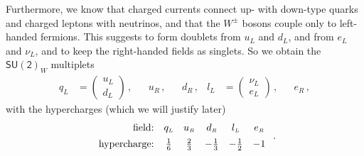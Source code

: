 \documentclass[12pt]{report}
\newcommand{\ls}{{\ensuremath{\scriptscriptstyle L}}}
\newcommand{\rs}{{\ensuremath{\scriptscriptstyle R}}}
\newcommand{\2}{\ensuremath{\sqrt{2}\,}}
\begin{document}
{      Furthermore, we know that charged currents connect up- with down-type
      quarks and charged leptons with neutrinos, and that the $W^\pm$ bosons couple only to
      left-handed fermions. This suggests to form doublets  from $u_\ls$ and $d_\ls$, and
      from $e_\ls$ and $\nu_\ls$, and to keep the right-handed fields as singlets. So we 
      obtain the $\mathsf{SU(2)}_W$ multiplets
       \begin{align}
        q_\ls&=\begin{pmatrix} u_\ls \\ d_\ls\end{pmatrix}\,, &&u_\rs\,, && d_\rs\,,  &
        l_\ls&=\begin{pmatrix} \nu_\ls \\  e_\ls\end{pmatrix}\,, &&  e_\rs\,,
      \end{align}
      with the hypercharges (which we will justify later) 
      \begin{align}\label{eq:hypercharges}
        \begin{array}{rccccc}
          \text{field:} & q_\ls & u_\rs & d_\rs & l_\ls & e_\rs\\
          \text{hypercharge:\rule[12pt]{0pt}{1pt}} & \frac{1}{6} & \frac{2}{3} & -\frac{1}{3} &
          -\frac{1}{2} & -1 
        \end{array}\;.
      \end{align}

}
\end{document}
